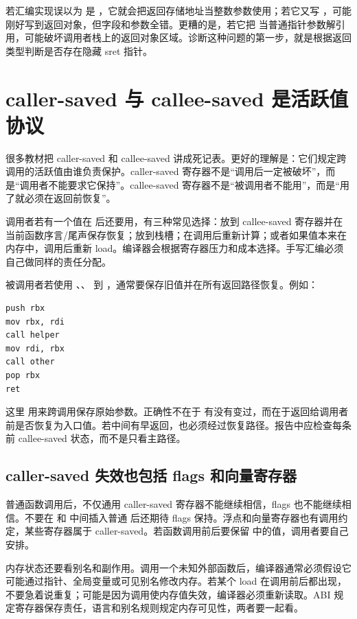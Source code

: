 若汇编实现误以为  是 ，它就会把返回存储地址当整数参数使用；若它又写 \code{[rdi]}，可能刚好写到返回对象，但字段和参数全错。更糟的是，若它把  当普通指针参数解引用，可能破坏调用者栈上的返回对象区域。诊断这种问题的第一步，就是根据返回类型判断是否存在隐藏 sret 指针。

\section{caller-saved 与 callee-saved 是活跃值协议}

很多教材把 caller-saved 和 callee-saved 讲成死记表。更好的理解是：它们规定跨调用的活跃值由谁负责保护。caller-saved 寄存器不是“调用后一定被破坏”，而是“调用者不能要求它保持”。callee-saved 寄存器不是“被调用者不能用”，而是“用了就必须在返回前恢复”。

调用者若有一个值在  后还要用，有三种常见选择：放到 callee-saved 寄存器并在当前函数序言/尾声保存恢复；放到栈槽；在调用后重新计算；或者如果值本来在内存中，调用后重新 load。编译器会根据寄存器压力和成本选择。手写汇编必须自己做同样的责任分配。

被调用者若使用 、、 到 ，通常要保存旧值并在所有返回路径恢复。例如：

\begin{lstlisting}
push rbx
mov rbx, rdi
call helper
mov rdi, rbx
call other
pop rbx
ret
\end{lstlisting}

这里  用来跨调用保存原始参数。正确性不在于  有没有变过，而在于返回给调用者前是否恢复为入口值。若中间有早返回，也必须经过恢复路径。报告中应检查每条  前 callee-saved 状态，而不是只看主路径。

\subsection{caller-saved 失效也包括 flags 和向量寄存器}

普通函数调用后，不仅通用 caller-saved 寄存器不能继续相信，flags 也不能继续相信。不要在  和  中间插入普通  后还期待 flags 保持。浮点和向量寄存器也有调用约定，某些寄存器属于 caller-saved。若函数调用前后要保留  中的值，调用者要自己安排。

内存状态还要看别名和副作用。调用一个未知外部函数后，编译器通常必须假设它可能通过指针、全局变量或可见别名修改内存。若某个 load 在调用前后都出现，不要急着说重复；可能是因为调用使内存值失效，编译器必须重新读取。ABI 规定寄存器保存责任，语言和别名规则规定内存可见性，两者要一起看。

